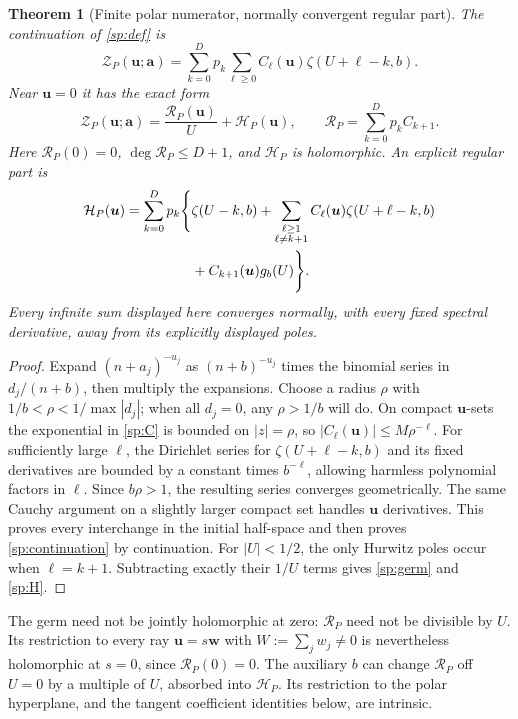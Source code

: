 \documentclass[11pt,letterpaper]{article}
\numberwithin{equation}{section}
\theoremstyle{plain}
\newtheorem{theorem}{Theorem}[section]
\theoremstyle{definition}
\theoremstyle{remark}
\newcommand{\cZ}{\mathcal Z}
\newcommand{\cH}{\mathcal H}
\newcommand{\cR}{\mathcal R}
\begin{document}
\begin{theorem}[Finite polar numerator, normally convergent regular part]
\label{sp:thm:germ}
The continuation of \eqref{sp:def} is
\begin{equation}\label{sp:continuation}
 \cZ_P(\boldsymbol u;\boldsymbol a)
   =\sum_{k=0}^D p_k\sum_{\ell\ge0}
          C_\ell(\boldsymbol u)\zeta(U+\ell-k,b).
\end{equation}
Near $\boldsymbol u=0$ it has the exact form
\begin{equation}\label{sp:germ}
 \boxed{\cZ_P(\boldsymbol u;\boldsymbol a)
             =\frac{\cR_P(\boldsymbol u)}U+\cH_P(\boldsymbol u),
 \qquad \cR_P=\sum_{k=0}^D p_k C_{k+1}.}
\end{equation}
Here $\cR_P(0)=0$, $\deg\cR_P\le D+1$, and $\cH_P$ is holomorphic.
An explicit regular part is
\begin{align}\label{sp:H}
 \cH_P(\boldsymbol u)=\sum_{k=0}^D p_k\Bigg\{&\zeta(U-k,b)
   +\sum_{\substack{\ell\ge1\\\ell\ne k+1}}
            C_\ell(\boldsymbol u)\zeta(U+\ell-k,b)\notag\\
   &+C_{k+1}(\boldsymbol u)g_b(U)\Bigg\}.
\end{align}
Every infinite sum displayed here converges normally, with every fixed
spectral derivative, away from its explicitly displayed poles.
\end{theorem}

\begin{proof}
Expand $(n+a_j)^{-u_j}$ as $(n+b)^{-u_j}$ times the binomial series
in $d_j/(n+b)$, then multiply the expansions. Choose a radius $\rho$
with $1/b<\rho<1/\max|d_j|$; when all $d_j=0$, any $\rho>1/b$
will do. On compact $\boldsymbol u$-sets the exponential in
\eqref{sp:C} is bounded on $|z|=\rho$, so
$|C_\ell(\boldsymbol u)|\le M\rho^{-\ell}$.
For sufficiently large $\ell$, the Dirichlet series for
$\zeta(U+\ell-k,b)$ and its fixed derivatives are bounded by a
constant times $b^{-\ell}$, allowing harmless polynomial factors in
$\ell$. Since $b\rho>1$, the resulting series converges geometrically.
The same Cauchy argument on a slightly larger compact set handles
$\boldsymbol u$ derivatives. This proves every interchange in the
initial half-space and then proves \eqref{sp:continuation} by continuation.
For $|U|<1/2$, the only Hurwitz poles occur when $\ell=k+1$.
Subtracting exactly their $1/U$ terms gives \eqref{sp:germ} and
\eqref{sp:H}.
\end{proof}

The germ need not be jointly holomorphic at zero: $\cR_P$ need not
be divisible by $U$. Its restriction to every ray
$\boldsymbol u=s\boldsymbol w$ with $W:=\sum_jw_j\ne0$ is nevertheless
holomorphic at $s=0$, since $\cR_P(0)=0$. The auxiliary $b$ can change
$\cR_P$ off $U=0$ by a multiple of $U$, absorbed into $\cH_P$.
Its restriction to the polar hyperplane, and the tangent coefficient
identities below, are intrinsic.
\end{document}
